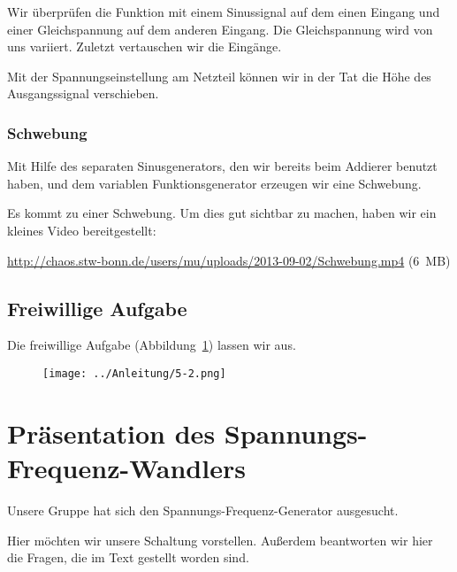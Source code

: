 Wir überprüfen die Funktion mit einem Sinussignal auf dem einen Eingang und
einer Gleichspannung auf dem anderen Eingang. Die Gleichspannung wird von uns
variiert. Zuletzt vertauschen wir die Eingänge.

Mit der Spannungseinstellung am Netzteil können wir in der Tat die Höhe des
Ausgangssignal verschieben.

\subsubsection{Schwebung}

Mit Hilfe des separaten Sinusgenerators, den wir bereits beim Addierer benutzt
haben, und dem variablen Funktionsgenerator erzeugen wir eine Schwebung.

Es kommt zu einer Schwebung. Um dies gut sichtbar zu machen, haben wir ein
kleines Video bereitgestellt:

\url{http://chaos.stw-bonn.de/users/mu/uploads/2013-09-02/Schwebung.mp4} (6~MB)

\FloatBarrier
\subsection{Freiwillige Aufgabe}

Die freiwillige Aufgabe (Abbildung~\ref{fig:5-2}) lassen wir aus.

\begin{figure}[htbp]
	\centering
	\texttt{[image: ../Anleitung/5-2.png]}
	\caption{%
		\cite[Abbildung~5.2]{physik313-Anleitung}
	}
	\label{fig:5-2}
\end{figure}


\FloatBarrier
\section{Präsentation des Spannungs-Frequenz-Wandlers}

Unsere Gruppe hat sich den Spannungs-Frequenz-Generator ausgesucht.

Hier möchten wir unsere Schaltung vorstellen. Außerdem beantworten wir hier die
Fragen, die im Text gestellt worden sind.

